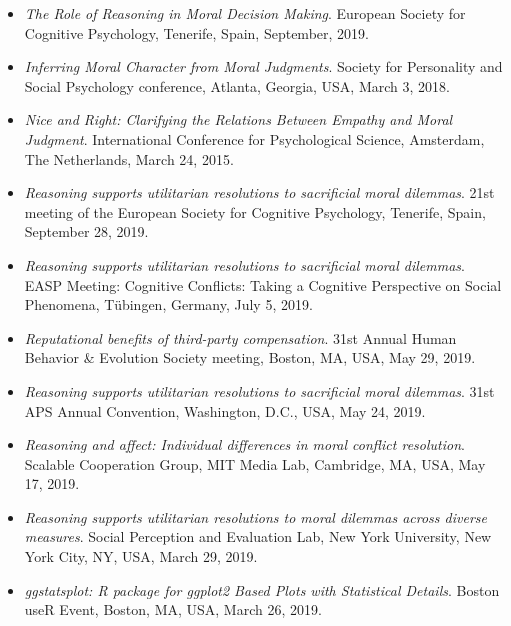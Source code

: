 \documentclass[10pt]{article}
\begin{document}

    \begin{itemize}
	\item \textit{The Role of Reasoning in Moral Decision Making}. European Society for Cognitive Psychology, Tenerife, Spain, September, 2019.
    
	
	\item \textit{Inferring Moral Character from Moral Judgments}. Society for Personality and Social Psychology conference, Atlanta, Georgia, USA, March 3, 2018.
	
	
	\item \textit{Nice and Right: Clarifying the Relations Between Empathy and Moral Judgment}. International Conference for Psychological Science, Amsterdam, The Netherlands, March 24, 2015.
	\item \textit{Reasoning supports utilitarian resolutions to sacrificial moral dilemmas}. 21st meeting of the European Society for Cognitive Psychology, Tenerife, Spain, September 28, 2019.
	

	\item \textit{Reasoning supports utilitarian resolutions to sacrificial moral dilemmas}. EASP Meeting: Cognitive Conflicts: Taking a Cognitive Perspective on Social Phenomena, Tübingen, Germany, July 5, 2019.
	

    \item \textit{Reputational benefits of third-party compensation}. 31st Annual Human Behavior \& Evolution Society meeting, Boston, MA, USA, May 29, 2019.
	

	\item \textit{Reasoning supports utilitarian resolutions to sacrificial moral dilemmas}. 31st APS Annual Convention, Washington, D.C., USA, May 24, 2019.
	

	\item \textit{Reasoning and affect: Individual differences in moral conflict resolution}. Scalable Cooperation Group, MIT Media Lab, Cambridge, MA, USA, May 17, 2019.
	

	\item \textit{Reasoning supports utilitarian resolutions to moral dilemmas across diverse measures}. Social Perception and Evaluation Lab, New York University, New York City, NY, USA, March 29, 2019.
	

	\item \textit{ggstatsplot: R package for ggplot2 Based Plots with Statistical Details}. Boston useR Event, Boston, MA, USA, March 26, 2019.
	


\end{itemize}
\end{document}
